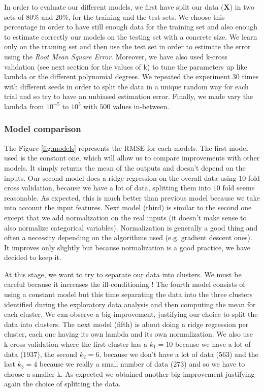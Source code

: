 \documentclass{article} %
\begin{document}
In order to evaluate our different models, we first have split our data ($\mathbf{X}$) in two sets of $80\%$ and $20\%$, for the training and the test sets. We choose this percentage in order to have still enough data for the training set and also enough to estimate correctly our models on the testing set with a concrete size. We learn only on the training set and then use the test set in order to estimate the error using the \textit{Root Mean Square Error}. Moreover, we have also used k-cross validation (see next section for the values of k) to tune the parameters up like lambda or the different polynomial degrees. We repeated the experiment $30$ times with different seeds in order to split the data in a unique random way for each trial and so try to have an unbiased estimation error. Finally, we made vary the lambda from $10^{-5}$ to $10^{5}$ with $500$ values in-between.

\subsubsection{Model comparison}

The Figure \ref{fig:models} represents the RMSE for each models. The first model used is the constant one, which will allow us to compare improvements with other models. It simply returns the mean of the outputs and doesn't depend on the inputs. Our second model does a ridge regression on the overall data using $10$ fold cross validation, because we have a lot of data, splitting them into $10$ fold seems reasonable. As expected, this is much better than previous model because we take into account the input features. Next model (third) is similar to the second one except that we add normalization on the real inputs (it doesn't make sense to also normalize categorical variables). Normalization is generally a good thing and often a necessity depending on the algorithms used (e.g. gradient descent ones). It improves only slightly but because normalization is a good practice, we have decided to keep it.

At this stage, we want to try to separate our data into clusters. We must be careful because it increases the ill-conditioning ! The fourth model consists of using a constant model but this time separating the data into the three clusters identified during the exploratory data analysis and then computing the mean for each cluster. We can observe a big improvement, justifying our choice to split the data into clusters. The next model (fifth) is about doing a ridge regression per cluster, each one having its own lambda and its own normalization. We also use k-cross validation where the first cluster has a $k_1=10$ because we have a lot of data ($1937$), the second $k_2=6$, because we don't have a lot of data ($563$) and the last $k_3=4$ because we really a small number of data ($273$) and so we have to choose a smaller k. As expected we obtained another big improvement justifying again the choice of splitting the data.
\end{document}
